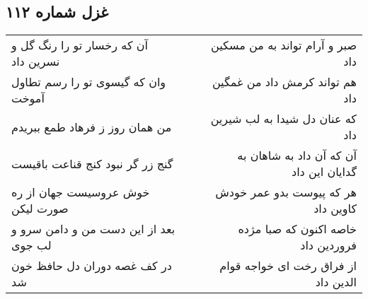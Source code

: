 \begin{center}
\section*{غزل شماره ۱۱۲}
\label{sec:sh112}
\begin{longtable}{l p{0.5cm} r}
آن که رخسار تو را رنگ گل و نسرین داد
&&
صبر و آرام تواند به من مسکین داد
\\
وان که گیسوی تو را رسم تطاول آموخت
&&
هم تواند کرمش داد من غمگین داد
\\
من همان روز ز فرهاد طمع ببریدم
&&
که عنان دل شیدا به لب شیرین داد
\\
گنج زر گر نبود کنج قناعت باقیست
&&
آن که آن داد به شاهان به گدایان این داد
\\
خوش عروسیست جهان از ره صورت لیکن
&&
هر که پیوست بدو عمر خودش کاوین داد
\\
بعد از این دست من و دامن سرو و لب جوی
&&
خاصه اکنون که صبا مژده فروردین داد
\\
در کف غصه دوران دل حافظ خون شد
&&
از فراق رخت ای خواجه قوام الدین داد
\\
\end{longtable}
\end{center}
